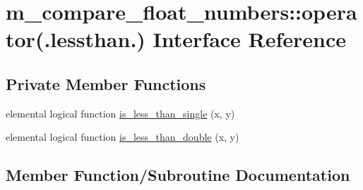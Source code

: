 \hypertarget{interfacem__compare__float__numbers_1_1operator_07_8lessthan_8_08}{}\section{m\+\_\+compare\+\_\+float\+\_\+numbers\+:\+:operator(.lessthan.) Interface Reference}
\label{interfacem__compare__float__numbers_1_1operator_07_8lessthan_8_08}
\subsection*{Private Member Functions}
\begin{DoxyCompactItemize}
\item 
elemental logical function \hyperlink{interfacem__compare__float__numbers_1_1operator_07_8lessthan_8_08_a89ad5ea470a44213216fd4c36ee1fe5d}{is\+\_\+less\+\_\+than\+\_\+single} (x, y)
\item 
elemental logical function \hyperlink{interfacem__compare__float__numbers_1_1operator_07_8lessthan_8_08_a2e78c8839d1724bdd3eff37d33f25506}{is\+\_\+less\+\_\+than\+\_\+double} (x, y)
\end{DoxyCompactItemize}


\subsection{Member Function/\+Subroutine Documentation}
\mbox{\label{interfacem__compare__float__numbers_1_1operator_07_8lessthan_8_08_a2e78c8839d1724bdd3eff37d33f25506}} 
